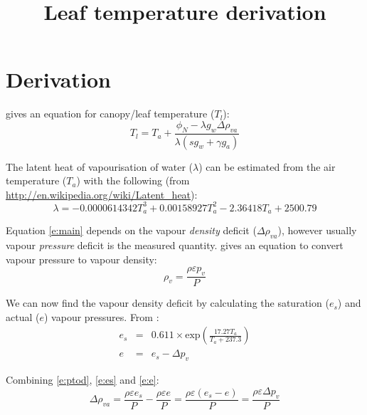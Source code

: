 \documentclass[a4paper]{article}
\title{Leaf temperature derivation}
\date{}
\begin{document}



\section{Derivation}

\citet[p.~418]{thornley90} gives an equation for canopy/leaf temperature ($T_l$):
\begin{equation}
\label{e:main}
T_l =  T_a + \frac{\phi_N - \lambda g_w \Delta \rho_{va}}{\lambda \left(s g_w + \gamma g_a\right)}
\end{equation}

The latent heat of vapourisation of water ($\lambda$) can be estimated from the air temperature 
($T_a$) with the following (from \url{http://en.wikipedia.org/wiki/Latent_heat}):
\begin{equation}
\lambda = -0.0000614342 T_a^3 + 0.00158927 T_a^2 - 2.36418 T_a + 2500.79
\end{equation}

Equation \eqref{e:main} depends on the vapour \emph{density} deficit ($\Delta \rho_{va}$), however 
usually vapour \emph{pressure} deficit is the measured quantity.  \citet[p.~409]{thornley90} gives 
an equation to convert vapour pressure to vapour density:
\begin{equation}
\label{e:ptod}
\rho_v = \frac{\rho \varepsilon p_v}{P}
\end{equation}

We can now find the vapour density deficit by calculating the saturation ($e_s$) and actual ($e$) 
    vapour pressures.  From \citet[p.~10]{monteith90}:
\begin{eqnarray}
\label{e:es}
e_s & = & 0.611 \times \text{exp}\left(\frac{17.27 T_a}{T_a + 237.3}\right) \\
e & = & e_s - \Delta p_v
\end{eqnarray}

Combining \eqref{e:ptod}, \eqref{e:es} and \eqref{e:e}:
\begin{equation}
\label{e:e}
\Delta \rho_{va} = \frac{\rho \varepsilon e_s}{P} - \frac{\rho \varepsilon e}{P} = \frac{\rho 
    \varepsilon (e_s - e)}{P} = \frac{\rho \varepsilon \Delta p_v}{P}
\end{equation}
\end{document}
